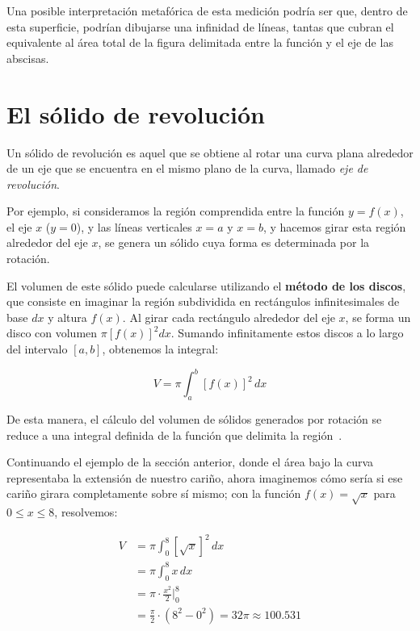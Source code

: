 \documentclass[12pt, oneside]{article}
\begin{document}
Una posible interpretación metafórica de esta medición podría ser que, dentro de esta superficie, podrían dibujarse una infinidad de líneas, tantas que cubran el equivalente al área total de la figura delimitada entre la función y el eje de las abscisas.

\section{El sólido de revolución}
Un sólido de revolución es aquel que se obtiene al rotar una curva plana alrededor de un eje que se encuentra en el mismo plano de la curva, llamado \textit{eje de revolución}. 

Por ejemplo, si consideramos la región comprendida entre la función $y = f(x)$, el eje $x$ ($y=0$), y las líneas verticales $x=a$ y $x=b$, y hacemos girar esta región alrededor del eje $x$, se genera un sólido cuya forma es determinada por la rotación. 

El volumen de este sólido puede calcularse utilizando el \textbf{método de los discos}, que consiste en imaginar la región subdividida en rectángulos infinitesimales de base $dx$ y altura $f(x)$. Al girar cada rectángulo alrededor del eje $x$, se forma un disco con volumen $\pi [f(x)]^2 dx$. Sumando infinitamente estos discos a lo largo del intervalo $[a,b]$, obtenemos la integral:

\begin{equation}
V = \pi \int_{a}^{b} [f(x)]^2\, dx
\label{eq:volSolidoRevolucion}
\end{equation}

De esta manera, el cálculo del volumen de sólidos generados por rotación se reduce a una integral definida de la función que delimita la región~\cite{eswiki:solidoRevolucion}.

Continuando el ejemplo de la sección anterior, donde el área bajo la curva representaba la extensión de nuestro cariño, ahora imaginemos cómo sería si ese cariño girara completamente sobre sí mismo; con la función \mbox{$f(x) = \sqrt{x}$} para $0 \leq x \leq 8$, 
resolvemos:

\begin{equation}
\begin{aligned}
V &= \pi \int_{0}^{8} [\sqrt{x}]^2\, dx \\[0.5em]
&= \pi \int_{0}^{8} x\, dx \\[0.5em]
&= \pi \cdot \frac{x^2}{2} \Big|_{0}^{8} \\[0.5em]
&= \frac{\pi}{2} \cdot (8^2 - 0^2) = 32\pi \approx 100.531
\end{aligned}
\label{eq:ejSolRev}
\end{equation}
\end{document}
